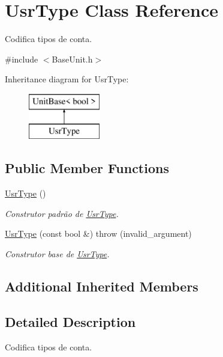 \hypertarget{classUsrType}{\section{Usr\-Type Class Reference}
\label{d1/dd4/classUsrType}
}


Codifica tipos de conta.  




{\ttfamily \#include $<$Base\-Unit.\-h$>$}

Inheritance diagram for Usr\-Type\-:\begin{figure}[H]
\begin{center}
\leavevmode
\includegraphics[height=2.000000cm]{d1/dd4/classUsrType}
\end{center}
\end{figure}
\subsection*{Public Member Functions}
\begin{DoxyCompactItemize}
\item 
\hyperlink{classUsrType_a51a73c6f2cfbca3174120a2796957c03}{Usr\-Type} ()
\begin{DoxyCompactList}\small\item\em Construtor padrão de \hyperlink{classUsrType}{Usr\-Type}. \end{DoxyCompactList}\item 
\hyperlink{classUsrType_a774f3a391ac5741802862cb7de682bb9}{Usr\-Type} (const bool \&)  throw (invalid\-\_\-argument)
\begin{DoxyCompactList}\small\item\em Construtor base de \hyperlink{classUsrType}{Usr\-Type}. \end{DoxyCompactList}\end{DoxyCompactItemize}
\subsection*{Additional Inherited Members}


\subsection{Detailed Description}
Codifica tipos de conta. 

